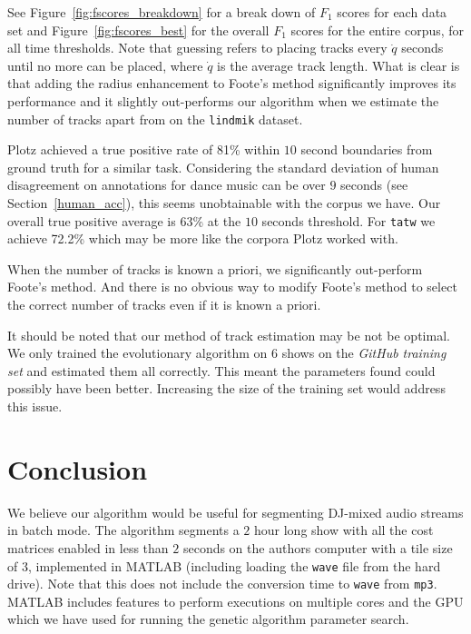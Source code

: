 \documentclass[twocolumn]{article}
\begin{document}
See Figure~\ref{fig:fscores_breakdown} for a break down of $F_1$ scores for each data set and Figure~\ref{fig:fscores_best} for the overall $F_1$ scores for the entire corpus, for all time thresholds. Note that guessing refers to placing tracks every $\dot q$ seconds until no more can be placed, where $\dot q$ is the average track length. What is clear is that adding the radius enhancement to Foote's method significantly improves its performance and it slightly out-performs our algorithm when we estimate the number of tracks apart from on the \texttt{lindmik} dataset. 

Plotz \citep{plotz2006automatic} achieved a true positive rate of 81\% within $10$ second boundaries from ground truth for a similar task. Considering the standard deviation of human disagreement on annotations for dance music can be over $9$ seconds (see Section~\ref{human_acc}), this seems unobtainable with the corpus we have. Our overall true positive average is 63\% at the $10$ seconds threshold. For \texttt{tatw} we achieve 72.2\% which may be more like the corpora Plotz worked with.

When the number of tracks is known a priori, we significantly out-perform Foote's method. And there is no obvious way to modify Foote's method to select the correct number of tracks even if it is known a priori. 

It should be noted that our method of track estimation may be not be optimal. We only trained the evolutionary algorithm on $6$ shows on the \textit{GitHub training set} and estimated them all correctly. This meant the parameters found could possibly have been better. Increasing the size of the training set would address this issue. 

\section{Conclusion}\label{conclusions}

We believe our algorithm would be useful for segmenting DJ-mixed audio streams in batch mode. The algorithm segments a $2$ hour long show with all the cost matrices enabled in less than $2$ seconds on the authors computer with a tile size of $3$, implemented in MATLAB (including loading the \texttt{wave} file from the hard drive). Note that this does not include the conversion time to \texttt{wave} from \texttt{mp3}. MATLAB includes features to perform executions on multiple cores and the GPU which we have used for running the genetic algorithm parameter search. 
\end{document}

